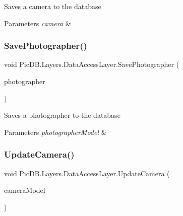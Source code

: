 Saves a camera to the database 


\begin{DoxyParams}{Parameters}
{\em camera} & \\
\hline
\end{DoxyParams}
\mbox{\label{class_pic_d_b_1_1_layers_1_1_data_access_layer_a6b4baf032a0dc297b35f28ab2455b8f5}} 
\subsubsection{\texorpdfstring{Save\+Photographer()}{SavePhotographer()}}
{\footnotesize\ttfamily void Pic\+D\+B.\+Layers.\+Data\+Access\+Layer.\+Save\+Photographer (\begin{DoxyParamCaption}\item[{\mbox{\hyperlink{class_pic_d_b_1_1_models_1_1_photographer_model}{Photographer\+Model}}}]{photographer }\end{DoxyParamCaption})}



Saves a photographer to the database 


\begin{DoxyParams}{Parameters}
{\em photographer\+Model} & \\
\hline
\end{DoxyParams}
\mbox{\label{class_pic_d_b_1_1_layers_1_1_data_access_layer_a1909e4d371b56f0b5d400658ed0b167b}} 
\subsubsection{\texorpdfstring{Update\+Camera()}{UpdateCamera()}}
{\footnotesize\ttfamily void Pic\+D\+B.\+Layers.\+Data\+Access\+Layer.\+Update\+Camera (\begin{DoxyParamCaption}\item[{I\+Camera\+Model}]{camera\+Model }\end{DoxyParamCaption})}



